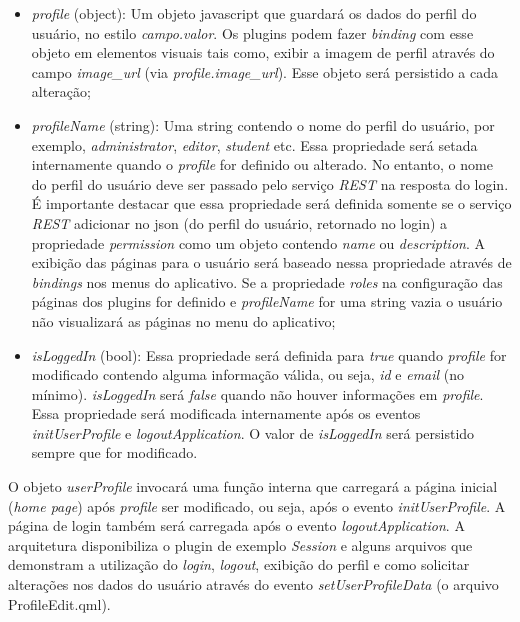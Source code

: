 \begin{itemize}
	\item \textit{profile} (object): Um objeto javascript que guardará os dados do perfil do usuário, no estilo \textit{campo.valor}. Os plugins podem fazer \textit{binding} com esse objeto em elementos visuais tais como, exibir a imagem de perfil através do campo \textit{image\_url} (via \textit{profile.image\_url}). Esse objeto será persistido a cada alteração;

	\item \textit{profileName} (string): Uma string contendo o nome do perfil do usuário, por exemplo, \textit{administrator}, \textit{editor}, \textit{student} etc. Essa propriedade será setada internamente quando o \textit{profile} for definido ou alterado. No entanto, o nome do perfil do usuário deve ser passado pelo serviço \textit{REST} na resposta do login. É importante destacar que essa propriedade será definida somente se o serviço \textit{REST} adicionar no json (do perfil do usuário, retornado no login) a propriedade \textit{permission} como um objeto contendo \textit{name} ou \textit{description}. A exibição das páginas para o usuário será baseado nessa propriedade através de \textit{bindings} nos menus do aplicativo. Se a propriedade \textit{roles} na configuração das páginas dos plugins for definido e \textit{profileName} for uma string vazia o usuário não visualizará as páginas no menu do aplicativo;

	\item \textit{isLoggedIn} (bool): Essa propriedade será definida para \textit{true} quando \textit{profile} for modificado contendo alguma informação válida, ou seja, \textit{id} e \textit{email} (no mínimo). \textit{isLoggedIn} será \textit{false} quando não houver informações em \textit{profile}. Essa propriedade será modificada internamente após os eventos \textit{initUserProfile} e \textit{logoutApplication}. O valor de \textit{isLoggedIn} será persistido sempre que for modificado.
\end{itemize}

O objeto \textit{userProfile} invocará uma função interna que carregará a página inicial (\textit{home page}) após \textit{profile} ser modificado, ou seja, após o evento \textit{initUserProfile}. A página de login também será carregada após o evento \textit{logoutApplication}. A arquitetura disponibiliza o plugin de exemplo \textit{Session} e alguns arquivos que demonstram a utilização do \textit{login}, \textit{logout}, exibição do perfil e como solicitar alterações nos dados do usuário através do evento \textit{setUserProfileData} (o arquivo ProfileEdit.qml).\par

